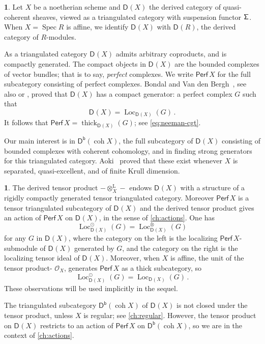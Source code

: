 \documentclass{amsart}
\newcommand{\dcat}[2][]{\cat{D}_{#1}(#2)}
\newcommand{\perf}[1]{\mathsf{Perf}\,#1}
\newcommand{\coh}{\operatorname{coh}}
\newcommand{\dbcat}[1]{\cat{D}^{\mathsf{b}}(#1)}
\newcommand{\mco}{\mathcal{O}}
\newcommand{\cat}[1]{{\mathsf{#1}}}
\newcommand{\Loc}{\operatorname{Loc}}
\newcommand{\lotimes}{\otimes^{\operatorname{L}}}
\newcommand{\shift}{{\sf\Sigma}}
\newcommand{\spec}{\operatorname{Spec}}
\newcommand{\thick}{\operatorname{thick}}
\theoremstyle{definition}
\newtheorem{chunk}[subsection]{}
\theoremstyle{remark}
\numberwithin{equation}{subsection}
\begin{document}
\begin{chunk}
\label{ch:BondalVanDenBergh}
Let $X$ be a noetherian scheme and $\dcat X$ the derived category of quasi-coherent sheaves, viewed as a triangulated category with suspension functor $\shift$. When $X=\spec R$ is affine, we identify $\dcat{X}$ with $\dcat{R}$, the derived category of $R$-modules. 

As a triangulated category $\dcat X$ admits arbitrary coproducts, and is compactly generated.
The compact objects in $\dcat X$ are the bounded complexes of vector bundles; that is to say, \emph{perfect} complexes. We write $\perf X$ for the full subcategory consisting of perfect complexes. Bondal and Van den Bergh~\cite[Theorem~3.1.1]{Bondal/VanDenBergh:2003}, see also \cite[Theorem~3.1.3]{Bondal/VanDenBergh:2003} or \cite[\href{https://stacks.math.columbia.edu/tag/09T4}{Tag 09T4}]{StacksProject}, proved that $\dcat X$ has a compact generator: a perfect complex $G$ such that 
\[
\dcat X=\Loc_{\dcat X}(G)\,.
\]
It follows that $\perf X=\thick_{\dcat X}(G)$; see \cref{eq:neeman-cgt}.

Our main interest is in $\dbcat{\coh X}$, the full subcategory of $\dcat X$ consisting of bounded complexes with coherent cohomology, and in finding strong generators for this triangulated category. Aoki~\cite{Aoki:2021} proved that these exist whenever $X$ is separated, quasi-excellent, and of finite Krull dimension.
\end{chunk}

\begin{chunk}
The derived tensor product $-\lotimes_X -$ endows $\dcat X$ with a structure of a rigidly compactly generated tensor triangulated category. Moreover $\perf X$ is a tensor triangulated subcategory of $\dcat X$ and the derived tensor product gives an action of $\perf X$ on $\dcat X$, in the sense of \cref{ch:actions}. One has
\[
\Loc^{\odot}_{\dcat X}(G) = \Loc^{\otimes}_{\dcat X}(G)
\]
for any $G$ in $\dcat X$, where the category on the left is the localizing $\perf X$-submodule of $\dcat X$ generated by $G$, and the category on the right is the localizing tensor ideal of $\dcat X$. Moreover, when $X$ is affine, the unit of the tensor product- $\mco_X$, generates $\perf{X}$ as a thick subcategory, so 
\[
\Loc^{\odot}_{\dcat X}(G)=\Loc_{\dcat X}(G)\,.
\]
These observations will be used implicitly in the sequel.

The triangulated subcategory $\dbcat{\coh X}$ of $\dcat X$ is not closed under the tensor product, unless $X$ is regular; see \cref{ch:regular}. However, the tensor product on $\dcat X$ restricts to an action of $\perf X$ on $\dbcat{\coh X}$, so we are in the context of \cref{ch:actions}.
\end{chunk}
\end{document}

